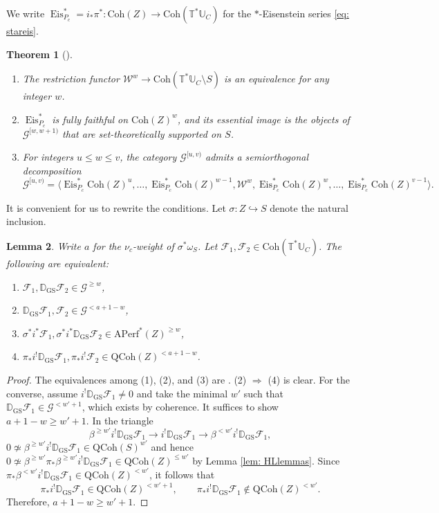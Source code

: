 \documentclass{amsart}
\newtheorem{theorem}{Theorem}[subsection]
\newtheorem{lemma}[theorem]{Lemma}
\theoremstyle{definition}
\theoremstyle{remark}
\numberwithin{equation}{section}
\newcommand{\U}{\mathbb{U}}
\newcommand{\mc}{\mathcal}
\newcommand{\D}{\mathbb{D}}
\newcommand{\QCoh}{\mathrm{QCoh}}
\DeclareMathOperator{\Eis}{\mathrm{Eis}}
\newcommand{\Coh}{\mathrm{Coh}}
\newcommand{\GS}{\mathrm{GS}}
\newcommand{\T}{\mathbb{T}}
\newcommand{\Aperf}{\mathrm{APerf}}
\begin{document}
We write $\Eis^*_{P_c}=i_*\pi^*\colon \Coh(Z)\to \Coh(\T^{\ast}\U_C)$ for the $*$-Eisenstein series \eqref{eq: stareis}.

\begin{theorem}[{\cite[Theorems 2.2.2, 3.3.1, Example 3.3.2]{HalpernLeistner}}]{\label{thm: HL3.3.1}}

\begin{enumerate}
    \item The restriction functor $\mathcal{W}^w \to \Coh(\T^{\ast}\U_C \setminus S)$ is an equivalence for any integer $w$. 
    \item $\Eis^{\ast}_{P_c}$ is fully faithful on $\Coh(Z)^w$, and its essential image is the objects of $\mathcal{G}^{[w,w+1)}$ that are set-theoretically supported on $S$. 
    \item For integers $u \leq w \leq v$, the category $\mathcal{G}^{[u,v)}$ admits a semiorthogonal decomposition
    \begin{equation*}
    \mathcal{G}^{[u,v)}=\langle \Eis^*_{P_c} \Coh(Z)^u, \dots, \Eis^*_{P_c} \Coh(Z)^{w-1}, \mathcal{W}^w, \Eis^*_{P_c} \Coh(Z)^{w}, \dots, \Eis^*_{P_c} \Coh(Z)^{v-1} \rangle. 
    \end{equation*}
\end{enumerate}    
\end{theorem}
It is convenient for us to rewrite the conditions. Let $\sigma\colon Z\hookrightarrow S$ denote the natural inclusion. 
\begin{lemma}\label{lem: HLEquivalenceWeightConditions}
Write $a$ for the $\nu_c$-weight of $\sigma^* \omega_S$. Let $\mc F_1, \mc F_2 \in \Coh(\T^{\ast}\U_C)$. The following are equivalent:
\begin{enumerate}
    \item $\mc F_1, \D_{\GS} \mc F_2\in \mc{G}^{\geq w}$,
    \item $\D_{\GS} \mc F_1,\mc F_2\in \mc{G}^{< a+1 -w}$, 
    \item $\sigma^* i^* \mc F_1, \sigma^* i^* \D_{\GS} \mc F_2\in \Aperf^*(Z)^{\geq w}$,
    \item $\pi_* i^! \D_{\GS} \mc F_1, \pi_* i^! \mc F_2 \in \QCoh(Z)^{< a+1 - w}$.
\end{enumerate}
\end{lemma}

\begin{proof}
The equivalences among (1), (2), and (3) are \cite[Proposition 3.2.6, Lemma 3.2.8]{HalpernLeistner}. (2) $\Rightarrow$ (4) is clear. For the converse, assume $i^!\D_\GS\mc F_1\neq 0$ and take the minimal $w'$ such that $\D_{\GS} \mc F_1\in \mc G^{< w' +1}$, which exists by coherence. It suffices to show $a+1-w\geq w'+1$. In the triangle
\[
\beta^{\geq w'}i^! \D_{\GS}\mc F_1 \to i^! \D_{\GS} \mc F_1 \to \beta^{< w'} i^! \D_{\GS} \mc F_1,
\]
$0\not\simeq \beta^{\geq w'}i^! \D_{\GS}\mc F_1\in \QCoh(S)^{w'}$ and hence 
$0\not\simeq \beta^{\geq w'}\pi_* \beta^{\geq w'}i^! \D_{\GS}\mc F_1 \in \QCoh(Z)^{\leq w'}$ by Lemma \ref{lem: HLlemmas}. Since $\pi_* \beta^{< w'} i^! \D_{\GS} \mc F_1 \in \QCoh(Z)^{< w'}$, it follows that
\[
\pi_* i^! \D_{\GS} \mc F_1 \in \QCoh(Z)^{< w' +1}, \qquad 
\pi_* i^! \D_{\GS} \mc F_1 \not\in \QCoh(Z)^{< w'}. 
\]
Therefore, $a+1-w \geq w'+1$.
\end{proof}
\end{document}
